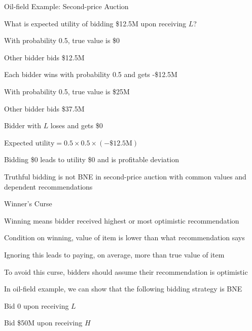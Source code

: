 \documentclass[11pt,aspectratio=169,handout]{beamer}
\begin{document}
  
  \begin{frame}{Oil-field Example: Second-price Auction}
   \begin{itemize}[<+->]
   \setlength{\itemsep}{0.6em}
    \item What is expected utility of bidding \$12.5M upon receiving $L$?
    \begin{itemizes}[0.5em]
     \item With probability 0.5, true value is \$0
     \begin{itemizes}[0.4em]
      \item Other bidder bids \$12.5M
      \item Each bidder wins with probability 0.5 and gets -\$12.5M
     \end{itemizes}
     \item With probability 0.5, true value is \$25M
     \begin{itemizes}[0.4em]
      \item Other bidder bids \$37.5M
      \item Bidder with $L$ loses and gets \$0
     \end{itemizes}
     \item Expected $\text{utility} = 0.5 \times 0.5 \times (-\text{\$12.5M})$
    \end{itemizes}
    \item Bidding \$0 leads to utility \$0 and is \alert{profitable deviation}
    \item \alert{Truthful bidding is not BNE in second-price auction with common values and dependent recommendations}
   \end{itemize}
  \end{frame}
  
  
  \begin{frame}{Winner's Curse}
   \begin{itemizes}
    \item Winning means bidder received highest or \alert{most optimistic} recommendation
    \item Condition on winning, value of item is lower than what recommendation says
    \item Ignoring this leads to paying, on average, \alert{more than} true value of item
    \item To avoid this curse, bidders should assume their recommendation is optimistic
    \item In oil-field example, we can show that the following bidding strategy is BNE
    \begin{itemizes}
     \item Bid 0 upon receiving $L$
     \item Bid \$50M upon receiving $H$  
    \end{itemizes} 
   \end{itemizes}
  \end{frame}
  
\end{document}
